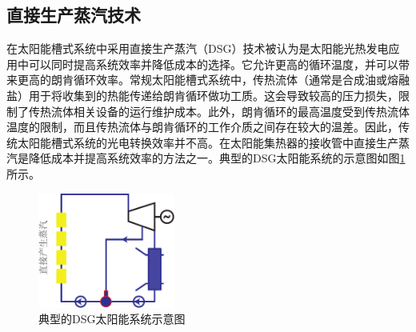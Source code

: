 \subsection{直接生产蒸汽技术}

在太阳能槽式系统中采用直接生产蒸汽（DSG）技术被认为是太阳能光热发电应用中可以同时提高系统效率并降低成本的选择。它允许更高的循环温度，并可以带来更高的朗肯循环效率。常规太阳能槽式系统中，传热流体（通常是合成油或熔融盐）用于将收集到的热能传递给朗肯循环做功工质。这会导致较高的压力损失，限制了传热流体相关设备的运行维护成本。此外，朗肯循环的最高温度受到传热流体温度的限制，而且传热流体与朗肯循环的工作介质之间存在较大的温差。因此，传统太阳能槽式系统的光电转换效率并不高。在太阳能集热器的接收管中直接生产蒸汽是降低成本并提高系统效率的方法之一。典型的DSG太阳能系统的示意图如图\ref{fig:DSG}所示。

\begin{figure}[!ht]
\centering 
\includegraphics[width=0.4\textwidth]{fig/DSG}
\caption{典型的DSG太阳能系统示意图}\label{fig:DSG}
\end{figure}

